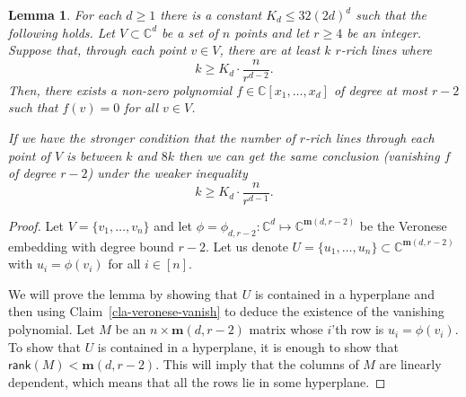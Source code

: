 \documentclass[11pt]{article}
\newtheorem{lem}[thm]{Lemma}
\def\C{{\mathbb{C}}}
\def\m{{\mathbf{m}}}
\def\rank{\textsf{rank}}
\begin{document}
\begin{lem}\label{lem-findpoly}
For each $d \geq 1$ there is a constant $K_d \leq 32(2d)^d$ such that the following holds. Let $V \subset \C^d$ be a set of $n$ points and let $r\geq 4$ be an integer. Suppose that, through each point $v \in V$, there are at least $k$ $r$-rich lines where $$k \geq K_d\cdot \frac{ n}{r^{d-2}}.$$ Then, there exists a non-zero polynomial $f \in \C[x_1,\ldots,x_d]$ of degree at most $r-2$ such that $f(v)=0$ for all $v \in V$. 

If we have the stronger condition that the number of $r$-rich lines through each point of $V$ is between $k$ and $8k$  then we can get the same conclusion (vanishing $f$ of degree $r-2$) under the weaker inequality $$k \geq K_d\cdot \frac{n}{r^{d-1}}.$$
\end{lem}
\begin{proof}

 Let $V = \{v_1,\ldots,v_n\}$ and let $\phi = \phi_{d,r-2} : \C^d \mapsto \C^{\m(d,r-2)}$ be the Veronese embedding with degree bound $r-2$. Let us denote $U = \{u_1,\ldots,u_n\} \subset \C^{\m(d,r-2)}$ with $u_i = \phi(v_i)$ for all $i \in [n]$. 


We will prove the lemma by showing that $U$ is contained in a hyperplane and then using  Claim~\ref{cla-veronese-vanish} to deduce the existence of the vanishing polynomial. Let $M$ be an $n \times \m(d,r-2)$ matrix whose $i$'th row is $u_i = \phi(v_i)$. To show that $U$ is contained in a hyperplane, it is enough to show that $\rank(M) < \m(d,r-2)$. This will imply that the columns of $M$ are linearly dependent, which means that all the rows lie in some hyperplane.


\end{proof}
\end{document}
